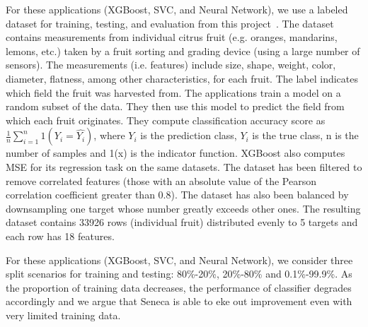 For these applications (XGBoost, SVC, and Neural Network), 
we use a labeled dataset for training, testing, and evaluation from 
this project~\cite{iot-cpu}. The dataset contains
measurements from individual citrus fruit (e.g. oranges, mandarins, lemons, etc.) 
taken by a fruit sorting and grading device (using a large number of sensors).  
The measurements (i.e. features)
include size, shape, weight, color, diameter, flatness, among other characteristics,
for each fruit.  The label indicates which field the fruit was harvested from.  
The applications train a model on a random subset of the data.  
They then use this model to predict the field
from which each fruit originates. They compute classification accuracy score as $\frac{1}{n}\sum_{i=1}^{n}1(Y_i = \hat{Y_i})$, where $Y_i$ is the prediction class, $Y_i$ is the true class, n is the number of samples and 1(x) is the indicator function. XGBoost also computes MSE for its regression task on the same datasets. The dataset has been filtered to remove correlated features (those with an absolute value of the Pearson correlation coefficient greater than 0.8). The dataset has also been balanced by downsampling one target whose number greatly exceeds other ones. The resulting dataset contains 33926 rows (individual fruit) distributed evenly to 5 targets and each row has 18 features.


For these applications (XGBoost, SVC, and Neural Network), we consider three split scenarios for training and testing: 80\%-20\%, 20\%-80\% and 0.1\%-99.9\%. As the proportion of training data decreases, the performance of classifier degrades accordingly and we argue that Seneca is able to eke out improvement even with very limited training data.

